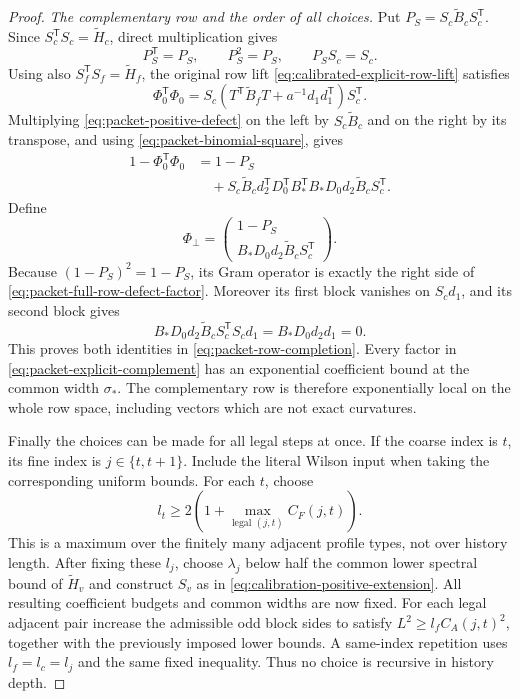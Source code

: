 \documentclass[11pt,reqno]{amsart}
\numberwithin{equation}{section}
\theoremstyle{definition}
\theoremstyle{remark}
\begin{document}
\begin{proof}
\smallskip\noindent
\emph{The complementary row and the order of all choices.}
Put \(P_S=S_c\widetilde B_cS_c^{\mathsf T}\).
Since \(S_c^{\mathsf T}S_c=\widetilde H_c\), direct multiplication
gives
\[
             P_S^{\mathsf T}=P_S,\qquad P_S^2=P_S,\qquad P_SS_c=S_c.
\]
Using also \(S_f^{\mathsf T}S_f=\widetilde H_f\), the original row
lift \eqref{eq:calibrated-explicit-row-lift} satisfies
\[
 \Phi_0^{\mathsf T}\Phi_0
     =S_c(T^{\mathsf T}\widetilde B_fT+a^{-1}d_1d_1^{\mathsf T})S_c^{\mathsf T}.
\]
Multiplying \eqref{eq:packet-positive-defect} on the left
by \(S_c\widetilde B_c\) and on the right by its transpose,
and using \eqref{eq:packet-binomial-square}, gives
\begin{equation}
 \begin{split}
 1-\Phi_0^{\mathsf T}\Phi_0
 &=1-P_S\\
 &\quad+S_c\widetilde B_cd_2^{\mathsf T}D_0^{\mathsf T}B_*^{\mathsf T}B_*D_0
                          d_2\widetilde B_cS_c^{\mathsf T}.
 \end{split}
 \label{eq:packet-full-row-defect-factor}
\end{equation}
Define
\begin{equation}
 \Phi_\perp=
 \begin{pmatrix}
       1-P_S\\ B_*D_0d_2\widetilde B_cS_c^{\mathsf T}
 \end{pmatrix}.
 \label{eq:packet-explicit-complement}
\end{equation}
Because \((1-P_S)^2=1-P_S\), its Gram operator is exactly
the right side of \eqref{eq:packet-full-row-defect-factor}.
Moreover its first block vanishes on \(S_cd_1\), and its
second block gives
\[
 B_*D_0d_2\widetilde B_cS_c^{\mathsf T}S_cd_1
                      =B_*D_0d_2d_1=0.
\]
This proves both identities in
\eqref{eq:packet-row-completion}. Every factor in
\eqref{eq:packet-explicit-complement} has an exponential
coefficient bound at the common width \(\sigma_*\).
The complementary row is therefore exponentially local on
the whole row space, including vectors which are not exact
curvatures.

Finally the choices can be made for all legal steps at once.
If the coarse index is \(t\), its fine index is
\(j\in\{t,t+1\}\). Include the literal Wilson input when
taking the corresponding uniform bounds. For each \(t\),
choose
\[
 l_t\ge2\left(1+
       \max_{\text{legal }(j,t)} C_F(j,t)\right).
\]
This is a maximum over the finitely many adjacent profile
types, not over history length. After fixing these \(l_j\),
choose \(\lambda_j\) below half the common lower spectral
bound of \(\widetilde H_v\) and construct \(S_v\) as in
\eqref{eq:calibration-positive-extension}. All resulting
coefficient budgets and common widths are now fixed.
For each legal adjacent pair increase the admissible odd
block sides to satisfy \(L^2\ge l_fC_A(j,t)^2\), together
with the previously imposed lower bounds. A same-index
repetition uses \(l_f=l_c=l_j\) and the same fixed
inequality. Thus no choice is recursive in history depth.


\end{proof}
\end{document}

